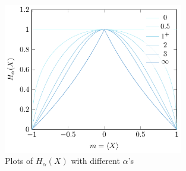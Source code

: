 \documentclass[hyperref, a4paper]{article}
\begin{document}
\begin{figure}
    \centering
    \includegraphics[width=0.7\textwidth]{plots/ising-entroy-alpha.pdf}
    \caption{Plots of $H_\alpha(X)$ with different $\alpha$'s}
    \label{fig:entropy-plot}
\end{figure}
\end{document}
